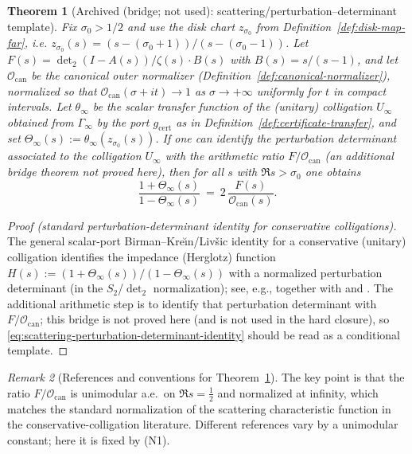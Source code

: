 \documentclass[11pt]{article}
\newtheorem{theorem}{Theorem}
\theoremstyle{definition}
\theoremstyle{remark}
\newtheorem{remark}[theorem]{Remark}
\theoremstyle{definition}
\begin{document}
\begin{theorem}[Archived (bridge; not used): scattering/perturbation--determinant template]\label{thm:scattering-perturbation-determinant-identity}
Fix $\sigma_0>1/2$ and use the disk chart $z_{\sigma_0}$ from Definition~\ref{def:disk-map-far}, i.e.
$z_{\sigma_0}(s)=(s-(\sigma_0+1))/(s-(\sigma_0-1))$.
Let $F(s)=\det_2(I-A(s))/\zeta(s)\cdot B(s)$ with $B(s)=s/(s-1)$, and let $\mathcal O_{\mathrm{can}}$ be the canonical outer normalizer (Definition~\ref{def:canonical-normalizer}), normalized so that $\mathcal O_{\mathrm{can}}(\sigma+it)\to 1$ as $\sigma\to+\infty$ uniformly for $t$ in compact intervals.
Let $\theta_\infty$ be the scalar transfer function of the (unitary) colligation $U_\infty$ obtained from $\Gamma_\infty$ by the port $g_{\mathrm{cert}}$ as in Definition~\ref{def:certificate-transfer}, and set $\Theta_\infty(s):=\theta_\infty(z_{\sigma_0}(s))$.
If one can identify the perturbation determinant associated to the colligation $U_\infty$ with the arithmetic ratio $F/\mathcal O_{\mathrm{can}}$ (an additional bridge theorem not proved here), then for all $s$ with $\Re s>\sigma_0$ one obtains
\begin{equation}\label{eq:scattering-perturbation-determinant-identity}
  \frac{1+\Theta_\infty(s)}{1-\Theta_\infty(s)}\ =\ 2\,\frac{F(s)}{\mathcal O_{\mathrm{can}}(s)}.
\end{equation}
\end{theorem}
\begin{proof}[Proof (standard perturbation-determinant identity for conservative colligations)]
The general scalar-port Birman--Kre\u{\i}n/Liv\v{s}ic identity for a conservative (unitary) colligation identifies the impedance (Herglotz) function
$H(s):=(1+\Theta_\infty(s))/(1-\Theta_\infty(s))$
with a normalized perturbation determinant (in the $S_2$/$\det_2$ normalization); see, e.g., \cite[Ch.~III]{GohbergKrein} together with \cite{NagyFoiasContractions} and \cite[Ch.~2]{RosenblumRovnyak}.
The additional arithmetic step is to identify that perturbation determinant with $F/\mathcal O_{\mathrm{can}}$; this bridge is not proved here (and is not used in the hard closure), so \eqref{eq:scattering-perturbation-determinant-identity} should be read as a conditional template.
\end{proof}
\begin{remark}[References and conventions for Theorem~\ref{thm:scattering-perturbation-determinant-identity}]
The key point is that the ratio $F/\mathcal O_{\mathrm{can}}$ is unimodular a.e.\ on $\Re s=\tfrac12$ and normalized at infinity, which matches the standard normalization of the scattering characteristic function in the conservative-colligation literature.
Different references vary by a unimodular constant; here it is fixed by (N1).
\end{remark}
\end{document}

